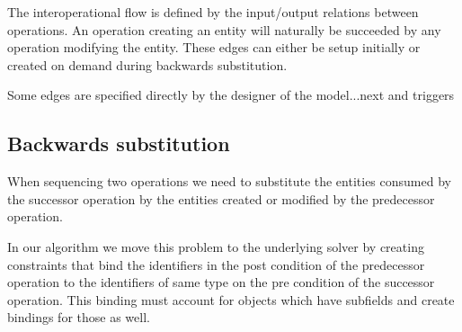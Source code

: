 The interoperational flow is defined by the input/output relations
between operations. An operation creating an entity will naturally be
succeeded by any operation modifying the entity. These edges can either
be setup initially or created on demand during backwards substitution. 

Some edges are specified directly by the designer of the model...next
and triggers

\subsection{Backwards substitution}
\label{sec:backw-subst}

When sequencing two operations we need to substitute the entities
consumed by the successor operation by the entities created or
modified by the predecessor operation.

In our algorithm we move this problem to the underlying solver by
creating constraints that bind the identifiers in the post condition
of the predecessor operation to the identifiers of same type on the
pre condition of the successor operation. This binding must account
for objects which have subfields and create bindings for those as
well.


